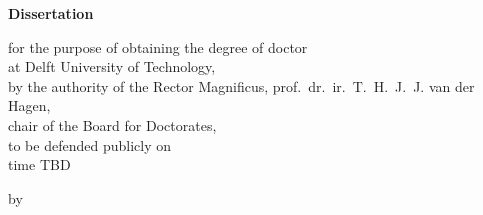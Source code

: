 \begin{titlepage}

\begin{center}

\vspace*{2\bigskipamount}

{\makeatletter
\titlestyle\bfseries\LARGE\@title
\makeatother}

{\makeatletter
\ifx\@subtitle\undefined\else
    \bigskip
    \titlefont\titleshape\Large\@subtitle
\fi
\makeatother}

\end{center}

\cleardoublepage
\thispagestyle{empty}

\begin{center}


\vspace*{2\bigskipamount}

{\makeatletter
\titlestyle\bfseries\LARGE\@title
\makeatother}

{\makeatletter
\ifx\@subtitle\undefined\else
    \bigskip
    \titlefont\titleshape\Large\@subtitle
\fi
\makeatother}

\vfill


{\Large\titlefont\bfseries Dissertation}

\bigskip
\bigskip

for the purpose of obtaining the degree of doctor \\
at Delft University of Technology, \\
by the authority of the Rector Magnificus, prof.\ dr.\ ir.\ T.\ H.\ J.\ J. van der Hagen, \\
chair of the Board for Doctorates, \\
to be defended publicly on \\
time TBD

\bigskip
\bigskip

by

\bigskip
\bigskip

\makeatletter
{\Large\titlefont\bfseries\@firstname\ \titleshape{\MakeUppercase{\@lastname}}}
\makeatother


\end{center}
\end{titlepage}
